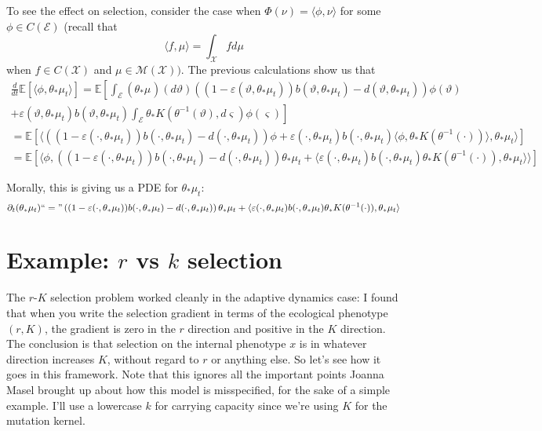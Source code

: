 \documentclass[11pt]{amsart}
\theoremstyle{remark}
\theoremstyle{definition}
\begin{document}
To see the effect on selection, consider the case when $\Phi(\nu) = \langle \phi, \nu \rangle$ for some $\phi \in C(\mathcal{E})$ (recall that
\[
	\langle f, \mu \rangle = \int_{\mathcal{X}} f d\mu
\]
when $f \in C(\mathcal{X})$ and $\mu \in \mathcal{M}(\mathcal{X}))$.  The previous calculations show us that 
\begin{multline*}
	\frac{d}{dt} \mathbb{E}[\langle \phi, \theta_{*}\mu_{t} \rangle] 
	= \mathbb{E}\left[\int_{\mathcal{E}} (\theta_{*}\mu_{})(d\vartheta) 
	\left((1-\varepsilon(\vartheta,\theta_{*}\mu_{t})) b(\vartheta,\theta_{*}\mu_{t})- d(\vartheta,\theta_{*}\mu_{t})\right)\phi(\vartheta)\right.\\
	\left.+ \varepsilon(\vartheta,\theta_{*}\mu_{t}) b(\vartheta,\theta_{*}\mu_{t})
		\int_{\mathcal{E}} \theta_{*}K(\theta^{-1}(\vartheta),d\varsigma)\phi(\varsigma)\right]\\
	= \mathbb{E}\left[\langle \left((1-\varepsilon(\cdot,\theta_{*}\mu_{t})) b(\cdot,\theta_{*}\mu_{t})
		- d(\cdot,\theta_{*}\mu_{t})\right)\phi 
		+ \varepsilon(\cdot,\theta_{*}\mu_{t}) b(\cdot,\theta_{*}\mu_{t})\langle \phi, \theta_{*}K(\theta^{-1}(\cdot)) \rangle, \theta_{*}\mu_{t} \rangle 
		\right] \\
	= \mathbb{E}\left[\langle \phi, \left((1-\varepsilon(\cdot,\theta_{*}\mu_{t})) b(\cdot,\theta_{*}\mu_{t})
		- d(\cdot,\theta_{*}\mu_{t}) \right) \theta_{*}\mu_{t}
		+ \langle  \varepsilon(\cdot,\theta_{*}\mu_{t}) b(\cdot,\theta_{*}\mu_{t}) \theta_{*}K(\theta^{-1}(\cdot)),\theta_{*}\mu_{t}\rangle \rangle\right]
\end{multline*}

Morally, this is giving us a PDE for $\theta_{*}\mu_{t}$:
\[
	\partial_{t} (\theta_{*}\mu_{t}) ``=\text{''} \left((1-\varepsilon(\cdot,\theta_{*}\mu_{t})) b(\cdot,\theta_{*}\mu_{t})
		- d(\cdot,\theta_{*}\mu_{t}) \right) \theta_{*}\mu_{t}
		+ \langle  \varepsilon(\cdot,\theta_{*}\mu_{t}) b(\cdot,\theta_{*}\mu_{t}) \theta_{*}K(\theta^{-1}(\cdot)),\theta_{*}\mu_{t}\rangle
\]


\section*{Example: $r$ vs $k$ selection}

The $r$-$K$ selection problem worked cleanly in the adaptive dynamics
case: I found that when you write the selection gradient in terms
of the ecological phenotype $(r,K)$, the gradient is zero in the $r$
direction and positive in the $K$ direction.
The conclusion is that selection on the internal phenotype $x$ is
in whatever direction increases $K$, without regard to $r$ or anything
else.
So let's see how it goes in this framework.
Note that this ignores all the important points Joanna Masel brought up
about how this model is misspecified, for the sake of a simple example.
I'll use a lowercase $k$ for carrying capacity since we're using $K$ for
the mutation kernel.
\end{document}
